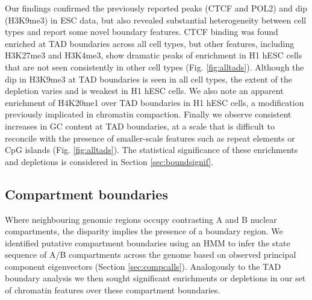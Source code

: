 \documentclass[a4paper,11pt,oneside]{book}
\begin{document}
Our findings confirmed the previously reported peaks (CTCF and POL2) and dip (H3K9me3) in ESC data, but also revealed substantial heterogeneity between cell types and report some novel boundary features. CTCF binding was found enriched at TAD boundaries across all cell types, but other features, including H3K27me3 and H3K4me3, show dramatic peaks of enrichment in H1 hESC cells that are not seen consistently in other cell types (Fig. \ref{fig:alltads}). Although the dip in H3K9me3 at TAD boundaries is seen in all cell types, the extent of the depletion varies and is weakest in H1 hESC cells. We also note an apparent enrichment of H4K20me1 over TAD boundaries in H1 hESC cells, a modification previously implicated in chromatin compaction.\cite{Evertts2013} Finally we observe consistent increases in GC content at TAD boundaries, at a scale that is difficult to reconcile with the presence of smaller-scale features such as repeat elements or CpG islands (Fig. \ref{fig:alltads}). The statistical significance of these enrichments and depletions is considered in Section \ref{sec:boundsignif}.

\subsection{Compartment boundaries}

Where neighbouring genomic regions occupy contrasting A and B nuclear
compartments, the disparity implies the presence of a boundary
region. We identified putative compartment boundaries using an
HMM to infer the state sequence of A/B compartments across the genome
based on observed principal component eigenvectors (Section \ref{sec:compcalls}). Analogously to the
TAD boundary analysis we then sought significant enrichments or
depletions in our set of chromatin features over these compartment boundaries.  
\end{document}
